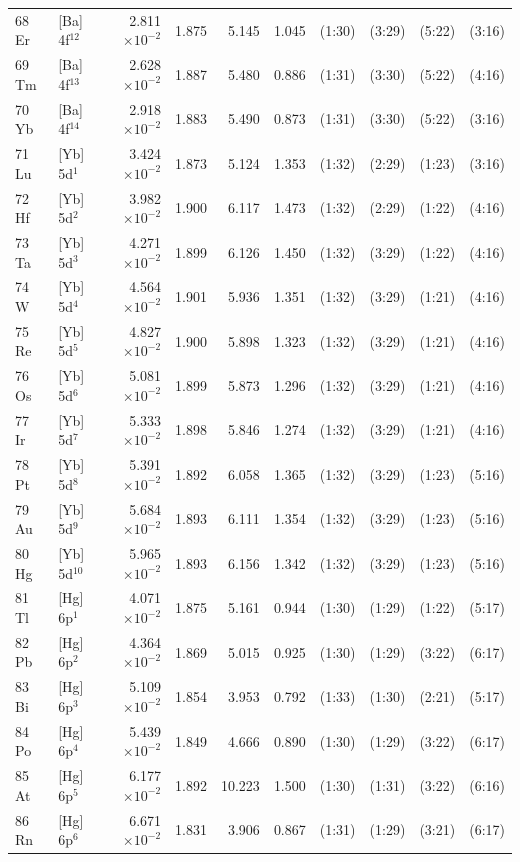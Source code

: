 \begin{longtable}{l l r r r r r r r r}
68 Er		&	[Ba] 4f$^{12}$	&	2.811$\times10^{-2}$	&	1.875	&	5.145	&	1.045	&	(1:30)	&	 (3:29)	&	 (5:22)	&	 (3:16)\\
69 Tm		&	[Ba] 4f$^{13}$	&	2.628$\times10^{-2}$	&	1.887	&	5.480	&	0.886	&	(1:31)	&	 (3:30)	&	 (5:22)	&	 (4:16)\\
70 Yb		&	[Ba] 4f$^{14}$	&	2.918$\times10^{-2}$	&	1.883	&	5.490	&	0.873	&	(1:31)	&	 (3:30)	&	 (5:22)	&	 (3:16)\\
71 Lu		&	[Yb] 5d$^{1}$	&	3.424$\times10^{-2}$	&	1.873	&	5.124	&	1.353	&	(1:32)	&	 (2:29)	&	 (1:23)	&	 (3:16)\\
72 Hf		&	[Yb] 5d$^{2}$	&	3.982$\times10^{-2}$	&	1.900	&	6.117	&	1.473	&	(1:32)	&	 (2:29)	&	 (1:22)	&	 (4:16)\\
73 Ta		&	[Yb] 5d$^{3}$	&	4.271$\times10^{-2}$	&	1.899	&	6.126	&	1.450	&	(1:32)	&	 (3:29)	&	 (1:22)	&	 (4:16)\\
74 W			&	[Yb] 5d$^{4}$	&	4.564$\times10^{-2}$	&	1.901	&	5.936	&	1.351	&	(1:32)	&	 (3:29)	&	 (1:21)	&	 (4:16)\\
75 Re		&	[Yb] 5d$^{5}$	&	4.827$\times10^{-2}$	&	1.900	&	5.898	&	1.323	&	(1:32)	&	 (3:29)	&	 (1:21)	&	 (4:16)\\
76 Os		&	[Yb] 5d$^{6}$	&	5.081$\times10^{-2}$	&	1.899	&	5.873	&	1.296	&	(1:32)	&	 (3:29)	&	 (1:21)	&	 (4:16)\\
77 Ir		 	&	[Yb] 5d$^{7}$	&	5.333$\times10^{-2}$	&	1.898	&	5.846	&	1.274	&	(1:32)	&	 (3:29)	&	 (1:21)	&	 (4:16)\\
78 Pt		 	&	[Yb] 5d$^{8}$	&	5.391$\times10^{-2}$	&	1.892	&	6.058	&	1.365	&	(1:32)	&	 (3:29)	&	 (1:23)	&	 (5:16)\\
79 Au		&	[Yb] 5d$^{9}$	&	5.684$\times10^{-2}$	&	1.893	&	6.111	&	1.354	&	(1:32)	&	 (3:29)	&	 (1:23)	&	 (5:16)\\
80 Hg	 	&	[Yb] 5d$^{10}$	&	5.965$\times10^{-2}$	&	1.893	&	6.156	&	1.342	&	(1:32)	&	 (3:29)	&	 (1:23)	&	 (5:16)\\
81 Tl		 	&	[Hg] 6p$^{1}$	&	4.071$\times10^{-2}$	&	1.875	&	5.161	&	0.944	&	(1:30)	&	 (1:29)	&	 (1:22)	&	 (5:17)\\
82 Pb		&	[Hg] 6p$^{2}$	&	4.364$\times10^{-2}$	&	1.869	&	5.015	&	0.925	&	(1:30)	&	 (1:29)	&	 (3:22)	&	 (6:17)\\
83 Bi		 	&	[Hg] 6p$^{3}$	&	5.109$\times10^{-2}$	&	1.854	&	3.953	&	0.792	&	(1:33)	&	 (1:30)	&	 (2:21)	&	 (5:17)\\
84 Po		&	[Hg] 6p$^{4}$	&	5.439$\times10^{-2}$	&	1.849	&	4.666	&	0.890	&	(1:30)	&	 (1:29)	&	 (3:22)	&	 (6:17)\\
85 At		 	&	[Hg] 6p$^{5}$	&	6.177$\times10^{-2}$	&	1.892	&	10.223	&	1.500	&	(1:30)	&	 (1:31)	&	 (3:22)	&	 (6:16)\\
86 Rn	 	&	[Hg] 6p$^{6}$	&	6.671$\times10^{-2}$	&	1.831	&	3.906	&	0.867	&	(1:31)	&	 (1:29)	&	 (3:21)	&	 (6:17)\\
\bottomrule
\end{longtable}

